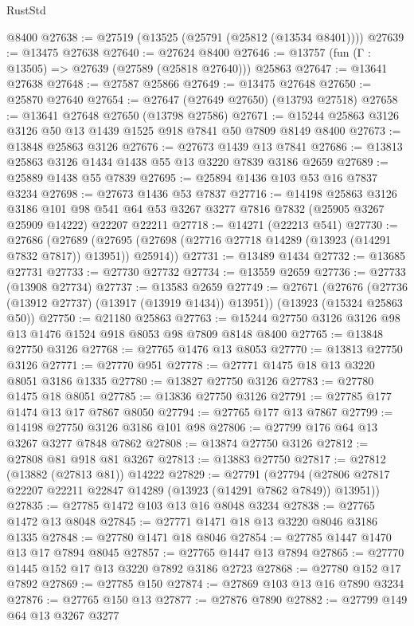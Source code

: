 \begin{lexlean}{RustStd}
\begin{coremodule}
    @8400
@27638 := @27519 (@13525 (@25791 (@25812 (@13534 @8401))))
@27639 := @13475 @27638
@27640 := @27624 @8400
@27646 := @13757 (fun (Γ : @13505) => @27639 (@27589 (@25818 @27640))) @25863
@27647 := @13641 @27638
@27648 := @27587 @25866
@27649 := @13475 @27648
@27650 := @25870 @27640
@27654 := @27647 (@27649 @27650) (@13793 @27518)
@27658 := @13641 @27648 @27650 (@13798 @27586)
@27671 := @15244 @25863 @3126 @3126 @50 @13 @1439 @1525 @918 @7841 @50 @7809 @8149 @8400
@27673 := @13848 @25863 @3126
@27676 := @27673 @1439 @13 @7841
@27686 := @13813 @25863 @3126 @1434 @1438 @55 @13 @3220 @7839 @3186 @2659
@27689 := @25889 @1438 @55 @7839
@27695 := @25894 @1436 @103 @53 @16 @7837 @3234
@27698 := @27673 @1436 @53 @7837
@27716 := @14198
    @25863
    @3126
    @3186
    @101
    @98
    @541
    @64
    @53
    @3267
    @3277
    @7816
    @7832
    (@25905 @3267 @25909 @14222)
    @22207
    @22211
@27718 := @14271 (@22213 @541)
@27730 := @27686
    (@27689 (@27695 (@27698 (@27716 @27718 @14289 (@13923 (@14291 @7832 @7817)) @13951)) @25914))
@27731 := @13489 @1434
@27732 := @13685 @27731
@27733 := @27730 @27732
@27734 := @13559 @2659
@27736 := @27733 (@13908 @27734)
@27737 := @13583 @2659
@27749 := @27671
    (@27676 (@27736 (@13912 @27737) (@13917 (@13919 @1434)) @13951))
    (@13923 (@15324 @25863 @50))
@27750 := @21180 @25863
@27763 := @15244 @27750 @3126 @3126 @98 @13 @1476 @1524 @918 @8053 @98 @7809 @8148 @8400
@27765 := @13848 @27750 @3126
@27768 := @27765 @1476 @13 @8053
@27770 := @13813 @27750 @3126
@27771 := @27770 @951
@27778 := @27771 @1475 @18 @13 @3220 @8051 @3186 @1335
@27780 := @13827 @27750 @3126
@27783 := @27780 @1475 @18 @8051
@27785 := @13836 @27750 @3126
@27791 := @27785 @177 @1474 @13 @17 @7867 @8050
@27794 := @27765 @177 @13 @7867
@27799 := @14198 @27750 @3126 @3186 @101 @98
@27806 := @27799 @176 @64 @13 @3267 @3277 @7848 @7862
@27808 := @13874 @27750 @3126
@27812 := @27808 @81 @918 @81 @3267
@27813 := @13883 @27750
@27817 := @27812 (@13882 (@27813 @81)) @14222
@27829 := @27791
    (@27794 (@27806 @27817 @22207 @22211 @22847 @14289 (@13923 (@14291 @7862 @7849)) @13951))
@27835 := @27785 @1472 @103 @13 @16 @8048 @3234
@27838 := @27765 @1472 @13 @8048
@27845 := @27771 @1471 @18 @13 @3220 @8046 @3186 @1335
@27848 := @27780 @1471 @18 @8046
@27854 := @27785 @1447 @1470 @13 @17 @7894 @8045
@27857 := @27765 @1447 @13 @7894
@27865 := @27770 @1445 @152 @17 @13 @3220 @7892 @3186 @2723
@27868 := @27780 @152 @17 @7892
@27869 := @27785 @150
@27874 := @27869 @103 @13 @16 @7890 @3234
@27876 := @27765 @150 @13
@27877 := @27876 @7890
@27882 := @27799 @149 @64 @13 @3267 @3277

\end{coremodule}
\end{lexlean}
